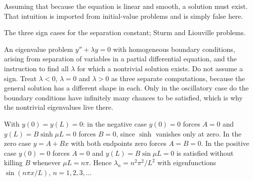 \begin{trap}
Assuming that because the equation is linear and smooth, a solution must exist. That intuition is imported from initial-value problems and is simply false here.
\end{trap}

\begin{seealsob}The three sign cases for the separation constant; Sturm and Liouville problems.\end{seealsob}

\cue An eigenvalue problem $y''+\lambda y=0$ with homogeneous boundary conditions, arising from separation of variables in a partial differential equation, and the instruction to find all $\lambda$ for which a nontrivial solution exists.
\method Do not assume a sign. Treat $\lambda<0$, $\lambda=0$ and $\lambda>0$ as three separate computations, because the general solution has a different shape in each. Only in the oscillatory case do the boundary conditions have infinitely many chances to be satisfied, which is why the nontrivial eigenvalues live there.

\begin{center}
\end{center}

\begin{worked}
With $y(0)=y(L)=0$: in the negative case $y(0)=0$ forces $A=0$ and $y(L)=B\sinh\mu L=0$ forces $B=0$, since $\sinh$ vanishes only at zero. In the zero case $y=A+Bx$ with both endpoints zero forces $A=B=0$. In the positive case $y(0)=0$ forces $A=0$ and $y(L)=B\sin\mu L=0$ is satisfied without killing $B$ whenever $\mu L=n\pi$. Hence $\lambda_{n}=n^{2}\pi^{2}/L^{2}$ with eigenfunctions $\sin(n\pi x/L)$, $n=1,2,3,\ldots$
\end{worked}

